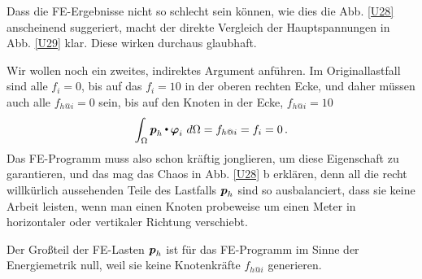 Dass die FE-Ergebnisse nicht so schlecht sein k\"{o}nnen, wie dies die Abb. \ref{U28} anscheinend suggeriert, macht der direkte Vergleich der Hauptspannungen in Abb. \ref{U29} klar. Diese wirken durchaus glaubhaft.

Wir wollen noch ein zweites, indirektes Argument anf\"{u}hren. Im Originallastfall sind alle $f_i = 0$, bis auf das $f_i = 10$ in der oberen rechten Ecke, und daher m\"{u}ssen auch alle $f_{h @i} = 0$ sein, bis auf den Knoten in der Ecke, $f_{h @i} = 10$
\begin{align}\label{Eq124}
\int_{\Omega} \mbox{\boldmath $p$}_h {\,\scriptscriptstyle \stackrel{\bullet}{{}}}\, \mbox{\boldmath $\varphi$}_i\,\,d\Omega = f_{h @i} = f_i = 0\,.
\end{align}
Das FE-Programm muss also schon kr\"{a}ftig jonglieren, um diese Eigenschaft zu garantieren, und das mag das \glq Chaos\grq{} in Abb. \ref{U28} b erkl\"{a}ren, denn all die recht willk\"{u}rlich aussehenden Teile des Lastfalls $\mbox{\boldmath $p$}_h$ sind so ausbalanciert, dass sie keine Arbeit leisten, wenn man einen Knoten probeweise um einen Meter in horizontaler oder vertikaler Richtung verschiebt.

Der Gro{\ss}teil der FE-Lasten $\mbox{\boldmath $p$}_h$  ist f\"{u}r das FE-Programm im Sinne der Energiemetrik null, weil sie keine Knotenkr\"{a}fte $f_{h @i}$ generieren.\\

